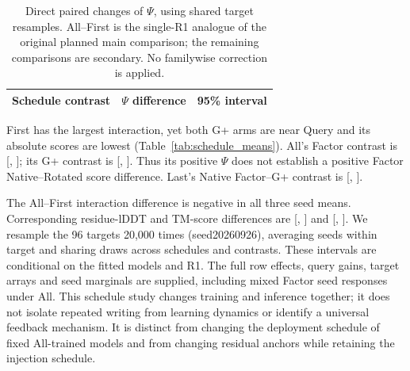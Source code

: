 \begin{table}[!htbp]\centering\small
\caption{Direct paired changes of $\Psi$, using shared target resamples.
All--First is the single-R1 analogue of the original planned main comparison;
the remaining comparisons are secondary. No familywise correction is applied.}
\label{tab:schedule_differences}
\begin{tabular}{lrr}\toprule
Schedule contrast & $\Psi$ difference & 95\% interval \\\midrule

\end{tabular}\end{table}

First has the largest interaction, yet both G+ arms are near Query and its
absolute scores are lowest (Table~\ref{tab:schedule_means}). All's Factor
contrast is 
[, ];
its G+ contrast is 
[, ].
Thus its positive $\Psi$ does not establish a positive Factor Native--Rotated
score difference.
Last's Native Factor--G+ contrast is 
[,
].

The All--First interaction difference is negative in all three seed means.
Corresponding residue-lDDT and TM-score differences are
[, ] and
[, ].
We resample the 96 targets 20,000 times (seed20260926), averaging seeds within
target and sharing draws across schedules and contrasts. These intervals are
conditional on the fitted models and R1. The full row effects, query gains,
target arrays and seed marginals are supplied, including mixed Factor seed
responses under All. This schedule study changes training and inference
together; it does not isolate repeated writing from learning dynamics or
identify a universal feedback mechanism. It is distinct from changing the
deployment schedule of fixed All-trained models and from changing residual
anchors while retaining the injection schedule.

